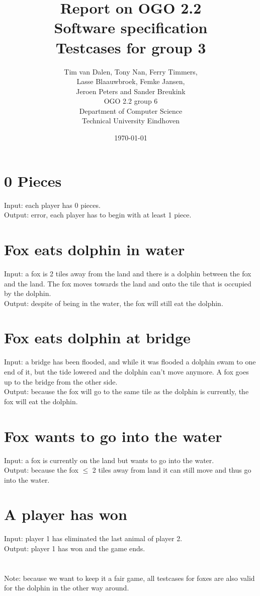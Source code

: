\documentclass[a4paper,11pt]{article}
\title{Report on OGO 2.2 \\ Software specification\\ Testcases for group 3}
\author{
        Tim van Dalen, Tony Nan, Ferry Timmers, \\ Lasse Blaauwbroek, Femke Jansen, \\Jeroen Peters and Sander Breukink\\ OGO 2.2 group 6 \\
                Department of Computer Science\\
        Technical University Eindhoven\\
}
\date{\today}
\begin{document}
\maketitle
	
	\section{0 Pieces}
    Input: each player has 0 pieces.\\
    Output: error, each player has to begin with at least 1 piece.

	\section{Fox eats dolphin in water}
    Input: a fox is 2 tiles away from the land and there is a dolphin between the fox and the land. The fox moves towards the land and onto the tile that is occupied by the dolphin.\\
    Output: despite of being in the water, the fox will still eat the dolphin.\\
    
    \section{Fox eats dolphin at bridge}
    Input: a bridge has been flooded, and while it was flooded a dolphin swam to one end of it, but the tide lowered and the dolphin can't move anymore. A fox goes up to the bridge from the other side.\\
    Output: because the fox will go to the same tile as the dolphin is currently, the fox will eat the dolphin.\\
    
    \section{Fox wants to go into the water}
    Input: a fox is currently on the land but wants to go into the water.\\
    Output: because the fox $\leq$ 2 tiles away from land it can still move and thus go into the water.\\
    
    \section{A player has won}
    Input: player 1 has eliminated the last animal of player 2.\\
    Output: player 1 has won and the game ends.\\
    
    \\
    \\
    Note: because we want to keep it a fair game, all testcases for foxes are also valid for the dolphin in the other way around.\\
\end{document}

